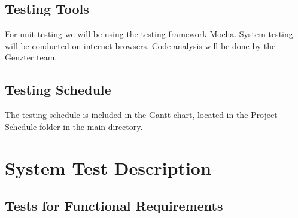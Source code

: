 \documentclass[11pt, oneside]{article}   	%
\begin{document}
\subsection{Testing Tools}
For unit testing we will be using the testing framework \href{http://mochajs.org}{Mocha}. System testing will be conducted on internet browsers. Code analysis will be done by the Genzter team.

\subsection{Testing Schedule}
The testing schedule is included in the Gantt chart, located in the Project Schedule folder in the main directory.

\newpage

\section{System Test Description}
\subsection{Tests for Functional Requirements}
\end{document}
